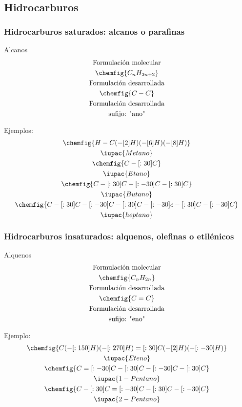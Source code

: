\subsection*{Hidrocarburos}
\subsubsection*{Hidrocarburos saturados: alcanos o parafinas}
\begin{Theorem*} {Alcanos}
	\begin{gather*}
		\text{Formulación molecular} \\
		\chemfig{C_nH_{2n+2}} \\
		\text{Formulación desarrollada} \\
		\chemfig{C-C} \\
		\text{Formulación desarrollada} \\
		\text{sufijo: "ano"}
	\end{gather*}
\end{Theorem*}
\noindent Ejemplos:\\
\begin{gather*}
	\chemfig{H-C(-[2]H)(-[6]H)(-[8]H)} \\
	\iupac{Metano} \\
	\chemfig{C-[:30]C}\\
	\iupac{Etano} \\
	\chemfig{C-[:30]C-[:-30]C-[:30]C} \\
	\iupac{Butano} \\
	\chemfig{C-[:30]C-[:-30]C-[:30]C-[:-30]c-[:30]C-[:-30]C} \\
	\iupac{heptano}
\end{gather*}
\subsubsection*{Hidrocarburos insaturados: alquenos, olefinas o etilénicos}
\begin{Theorem*} {Alquenos}
	\begin{gather*}
		\text{Formulación molecular} \\
		\chemfig{C_nH_{2n}} \\
		\text{Formulación desarrollada} \\
		\chemfig{C=C} \\
		\text{Formulación desarrollada} \\
		\text{sufijo: "eno"}
	\end{gather*}
\end{Theorem*}
\noindent Ejemplo: \\
\begin{gather*}
	\chemfig{C(-[:150]H)(-[:270]H)=[:30]C(-[2]H)(-[:-30]H)} \\
	\iupac{Eteno} \\
	\chemfig{C=[:-30]C-[:30]C-[:-30]C-[:30]C}\\
	\iupac{1-Pentano} \\
	\chemfig{C-[:30]C=[:-30]C-[:30]C-[:-30]C} \\
	\iupac{2-Pentano}
\end{gather*}
